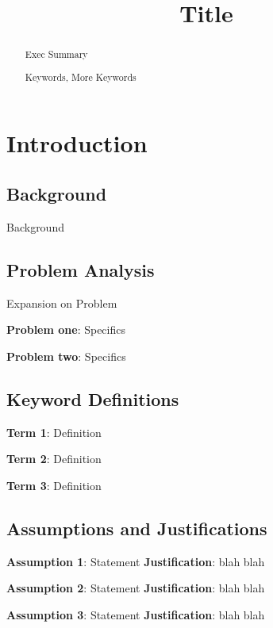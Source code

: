 \documentclass{mcm}
\title{Title}
\numberwithin{figure}{section}
\numberwithin{table}{section}
\numberwithin{equation}{section}
\begin{document}
    \begin{abstract}
        Exec Summary

        \begin{keywords}
            Keywords, More Keywords
        \end{keywords}

    \end{abstract}

    \maketitle
    \tableofcontents
    \newpage


    \section{Introduction}


    \subsection{Background}
    Background

    \subsection{Problem Analysis}
    Expansion on Problem

    \noindent\textbf{Problem one}: Specifics

    \noindent\textbf{Problem two}: Specifics

    \subsection{Keyword Definitions}
    \noindent\textbf{Term 1}: Definition

    \noindent\textbf{Term 2}: Definition

    \noindent\textbf{Term 3}: Definition

    \subsection{Assumptions and Justifications}
    \noindent\textbf{Assumption 1}: Statement
    \textbf{Justification}: blah blah

    \noindent\textbf{Assumption 2}: Statement
    \textbf{Justification}: blah blah

    \noindent\textbf{Assumption 3}: Statement
    \textbf{Justification}: blah blah
\end{document}
